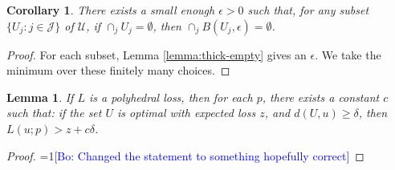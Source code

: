 \documentclass{article}
\newcommand{\Comments}{1}
\newcommand{\mynote}[2]{\ifnum\Comments=1\textcolor{#1}{#2}\fi}
\newcommand{\raf}[1]{\mynote{green}{[RF: #1]}}
\newcommand{\bo}[1]{\mynote{blue}{[Bo: #1]}}
\newtheorem{lemma}{Lemma}
\newtheorem{corollary}{Corollary}
\begin{document}
\begin{corollary} \label{cor:thick-intersect}
  There exists a small enough $\epsilon > 0$ such that, for any subset $\{U_j : j \in \mathcal{J}\}$ of $\mathcal{U}$, if $\cap_j U_j = \emptyset$, then $\cap_j B(U_j,\epsilon) = \emptyset$.
\end{corollary}
\begin{proof}
  For each subset, Lemma \ref{lemma:thick-empty} gives an $\epsilon$.
  We take the minimum over these finitely many choices.
\end{proof}

\begin{lemma} \label{lemma:distance-loss}
  If $L$ is a polyhedral loss, then for each $p$, there exists a constant $c$ such that:
  if the set $U$ is optimal with expected loss $z$, and $d(U,u) \geq \delta$, then $L(u;p) > z + c\delta$.
\end{lemma}
\begin{proof}
  \bo{Changed the statement to something hopefully correct}
\end{proof}
\end{document}
